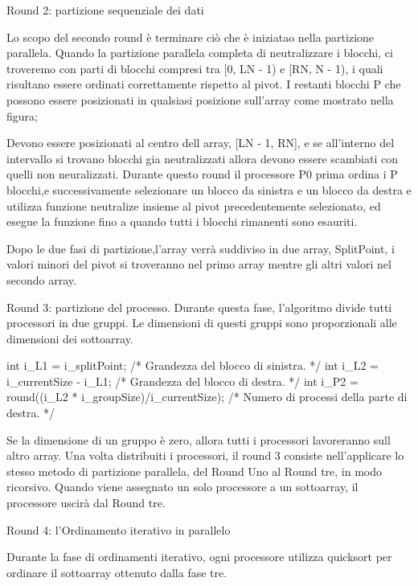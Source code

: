 \maketitle Round 2: partizione sequenziale dei dati

Lo scopo del secondo round è terminare ciò che è iniziatao nella partizione parallela.
Quando la partizione parallela completa di neutralizzare i blocchi, ci troveremo con parti di blocchi  compresi tra [0, LN - 1) e [RN, N - 1), i quali risultano essere ordinati correttamente rispetto al pivot. I restanti blocchi P che possono essere posizionati in qualsiasi posizione sull'array come mostrato nella figura;



Devono essere posizionati al centro dell array, [LN - 1, RN], e se all'interno del intervallo si trovano blocchi gia neutralizzati allora devono essere scambiati con quelli non neuralizzati. Durante questo  round il processore P0 prima ordina i P blocchi,e successivamente selezionare un blocco da sinistra e un blocco da destra e utilizza funzione neutralize insieme al pivot precedentemente selezionato, ed esegue la funzione fino a quando tutti i blocchi rimanenti sono esauriti.
 
Dopo le due fasi di partizione,l'array verrà suddiviso in due array, SplitPoint, i valori minori del pivot si troveranno nel primo array mentre gli altri valori nel secondo array.


\maketitle Round 3: partizione del processo. 
Durante questa fase, l'algoritmo divide tutti processori in due gruppi.
Le dimensioni di questi gruppi sono proporzionali alle dimensioni dei sottoarray.

  int i_L1 = i_splitPoint; /* Grandezza del blocco di sinistra. */
  int i_L2 = i_currentSize - i_L1; /* Grandezza del blocco di destra. */
  int i_P2 = round((i_L2 * i_groupSize)/i_currentSize); /* Numero di processi della parte di destra. */
    		

Se la dimensione di un gruppo è zero, allora tutti i processori lavoreranno sull altro array.
Una volta distribuiti i processori, il round 3 consiste nell'applicare lo stesso metodo di partizione parallela, del Round Uno al Round tre, in modo ricorsivo.
Quando viene assegnato un solo processore a un sottoarray, il processore uscirà dal Round tre.


\maketitle Round 4: l'Ordinamento iterativo in parallelo

Durante la fase di ordinamenti iterativo, ogni processore utilizza quicksort per ordinare il sottoarray ottenuto dalla fase tre. 



